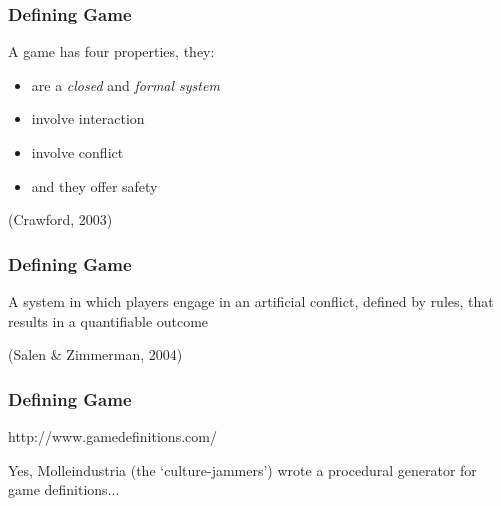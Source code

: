 \begin{frame}
	\frametitle{Defining Game}
		
	\begin{large}
	A game has four properties, they:
	
	\begin{itemize}
		\item are a \textit{closed} and \textit{formal system}
		\item involve interaction
		\item involve conflict
		\item and they offer safety
	\end{itemize}
	
	\end{large}
	
	\vspace{3em}
	
	\begin{center}
	(Crawford, 2003)
	\end{center}

\end{frame}

\begin{frame}
	\frametitle{Defining Game}
		
	\begin{center}
	\begin{huge}
	A system in which players engage in an artificial conflict, defined by rules, that results in a quantifiable outcome
	\end{huge}
	
	\vspace{3em}
	
	(Salen \& Zimmerman, 2004)
	\end{center}

\end{frame}

\begin{frame}
	\frametitle{Defining Game}
		
	\begin{center}
	\begin{large}
	http://www.gamedefinitions.com/
	\end{large}
	\end{center}
	
	\vspace{3em}
	
	\begin{small}
	Yes, Molleindustria (the `culture-jammers') wrote a procedural generator for game definitions...
	\end{small}
	
\end{frame}

